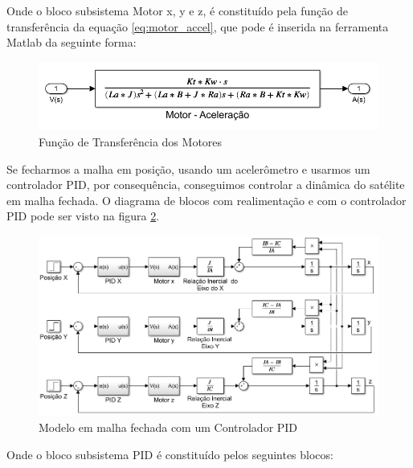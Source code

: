 Onde o bloco subsistema Motor x, y e z, é constituído pela função de transferência da equação \ref{eq:motor_accel}, que pode é inserida na ferramenta Matlab da seguinte forma:

\begin{figure}[H]
  \caption{Função de Transferência dos Motores}
  \begin{center}
      \includegraphics[scale=.45]{metodologia/img/modelo_satelite_motor}
  \end{center}
  \label{fig:modelo_satelite_motor}
\end{figure}

Se fecharmos a malha em posição, usando um acelerômetro e usarmos um controlador PID, por consequência, conseguimos controlar a dinâmica do satélite em malha fechada. O diagrama de blocos com realimentação e com o controlador PID pode ser visto na figura \ref{fig:modelo_satelite_pid}. 

\begin{figure}[H]
  \caption{Modelo em malha fechada com um Controlador PID}
  \begin{center}
      \includegraphics[scale=.6]{metodologia/img/modelo_satelite_pid}
  \end{center}
  \label{fig:modelo_satelite_pid}
\end{figure}

Onde o bloco subsistema PID é constituído pelos seguintes blocos:

